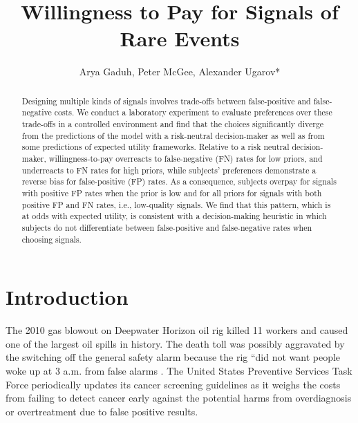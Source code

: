 \documentclass[12pt,a4paper]{article}
\title{\Large Willingness to Pay for Signals of Rare Events\\}
\author{\large Arya Gaduh, Peter McGee, Alexander Ugarov*}
\begin{document}
\maketitle
\onehalfspacing
\begin{abstract}{Designing multiple kinds of signals involves trade-offs between false-positive and false-negative costs. We conduct a laboratory experiment to evaluate preferences over these trade-offs in a controlled environment and find that the choices significantly diverge from the predictions of the model with a risk-neutral decision-maker as well as from some predictions of expected utility frameworks. Relative to a risk neutral decision-maker, willingness-to-pay overreacts to false-negative (FN) rates for low priors, and underreacts to FN rates for high priors, while subjects' preferences demonstrate a reverse bias for false-positive (FP) rates. As a consequence, subjects overpay for signals with positive FP rates when the prior is low and for all priors for signals with both positive FP and FN rates, i.e., low-quality signals. We find that this pattern, which is at odds with expected utility, is consistent with a decision-making heuristic in which subjects do not differentiate between false-positive and false-negative rates when choosing signals.}


\vspace{10pt}
\begin{singlespace}

\end{singlespace}
\end{abstract}

\vspace{180pt}
\newpage
\normalsize

\section{Introduction}

The 2010 gas blowout on Deepwater Horizon oil rig killed 11 workers and caused one of the largest oil spills in history. The death toll was possibly aggravated by the switching off the general safety alarm because the rig ``did not want people woke up at 3 a.m. from false alarms \citep{brown_oil_2010}. The United States Preventive Services Task Force periodically updates its cancer screening guidelines as it weighs the costs from failing to detect cancer early against the potential harms from overdiagnosis or overtreatment due to false positive results.
\end{document}
